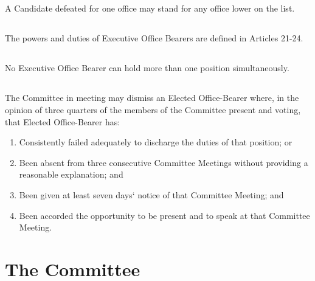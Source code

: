 \documentclass[10.5pt]{article}
\begin{document}
\subsection{} A Candidate defeated for one office may stand for any office lower on the list. 

\subsection{} The powers and duties of Executive Office Bearers are defined in Articles 21-24. 

\subsection{} No Executive Office Bearer can hold more than one position simultaneously.
\subsection{} The Committee in meeting may dismiss an Elected Office-Bearer where, in the opinion of
three quarters of the members of the Committee present and voting, that Elected Office-Bearer has:

\begin{enumerate}[label=(\alph*)]
    \item Consistently failed adequately to discharge the duties of that position; or
    \item Been absent from three consecutive Committee Meetings without providing a reasonable explanation; and
    \item Been given at least seven days‘ notice of that Committee Meeting; and
    \item Been accorded the opportunity to be present and to speak at that Committee Meeting.
    \newline
\end{enumerate}

\section{The Committee}
\end{document}
